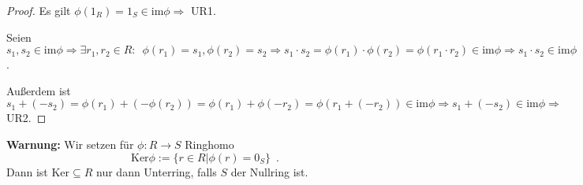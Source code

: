 \documentclass[12pt,a4paper]{scrartcl}
\begin{document}
\begin{proof}
	Es gilt $\phi(1_R) = 1_S\in\text{im}\phi\Rightarrow$ UR1.
	
	Seien $s_1, s_2\in\text{im}\phi\Rightarrow \exists r_1,r_2\in R:\enspace \phi (r_1) = s_1, \phi (r_2 )= s_2\Rightarrow s_1\cdot s_2 = \phi (r_1)\cdot \phi (r_2) = \phi(r_1\cdot r_2)\in \text{im}\phi\Rightarrow s_1\cdot s_2\in \text{im}\phi$.
	
	Außerdem ist $s_1+(-s_2) = \phi (r_1) + (-\phi (r_2)) = \phi (r_1)+\phi (-r_2) = \phi (r_1+(-r_2))\in\text{im}\phi\Rightarrow s_1+(-s_2)\in \text{im}\phi\Rightarrow$ UR2.
\end{proof}

\noindent
\textbf{Warnung:} Wir setzen für $\phi\colon R\to S$ Ringhomo
$$\text{Ker}\phi := \{r\in R|\phi(r)= 0_S\}\enspace.$$ Dann ist $\text{Ker}\subseteq R$ nur dann Unterring, falls $S$ der Nullring ist.





\end{document}
